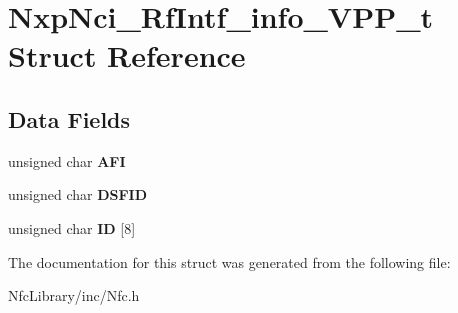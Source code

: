 \hypertarget{struct_nxp_nci___rf_intf__info___v_p_p__t}{}\section{Nxp\+Nci\+\_\+\+Rf\+Intf\+\_\+info\+\_\+\+V\+P\+P\+\_\+t Struct Reference}
\label{struct_nxp_nci___rf_intf__info___v_p_p__t}
\subsection*{Data Fields}
\begin{DoxyCompactItemize}
\item 
\mbox{\label{struct_nxp_nci___rf_intf__info___v_p_p__t_ae189fb5d0a258772435517aa5695ce31}} 
unsigned char {\bfseries A\+FI}
\item 
\mbox{\label{struct_nxp_nci___rf_intf__info___v_p_p__t_aabe1b523809b9b43fe4db1cf2fc60092}} 
unsigned char {\bfseries D\+S\+F\+ID}
\item 
\mbox{\label{struct_nxp_nci___rf_intf__info___v_p_p__t_ae8bec8413febd214ae96b7be59c37d25}} 
unsigned char {\bfseries ID} \mbox{[}8\mbox{]}
\end{DoxyCompactItemize}


The documentation for this struct was generated from the following file\+:\begin{DoxyCompactItemize}
\item 
Nfc\+Library/inc/Nfc.\+h\end{DoxyCompactItemize}
